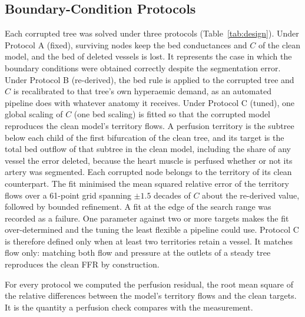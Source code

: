 \documentclass[journal]{IEEEtran}
\begin{document}
\subsection{Boundary-Condition Protocols}
Each corrupted tree was solved under three protocols (Table~\ref{tab:design}). Under Protocol A (fixed), surviving
nodes keep the bed conductances and $C$ of the clean model, and the bed of deleted vessels is lost. It represents
the case in which the boundary conditions were obtained correctly despite the segmentation error. Under Protocol B
(re-derived), the bed rule is applied to the corrupted tree and $C$ is recalibrated to that tree's own hyperaemic
demand, as an automated pipeline does with whatever anatomy it receives. Under Protocol C (tuned), one global
scaling of $C$ (one bed scaling) is fitted so that the corrupted model reproduces the clean model's territory flows. A perfusion
territory is the subtree below each child of the first bifurcation of the clean tree, and its target is the total
bed outflow of that subtree in the clean model, including the share of any vessel the error deleted, because the
heart muscle is perfused whether or not its artery was segmented. Each corrupted node belongs to the territory of
its clean counterpart. The fit minimised the mean squared relative error of the territory flows over a 61-point grid
spanning $\pm 1.5$ decades of $C$ about the re-derived value, followed by bounded refinement. A fit at the edge of
the search range was recorded as a failure. One parameter against two or more targets makes the fit over-determined
and the tuning the least flexible a pipeline could use. Protocol C is therefore defined only when at least two
territories retain a vessel. It matches flow only: matching both flow and pressure at the outlets of a steady tree
reproduces the clean FFR by construction.

For every protocol we computed the perfusion residual, the root mean square of the relative differences between the
model's territory flows and the clean targets. It is the quantity a perfusion check compares with the measurement.
\end{document}
